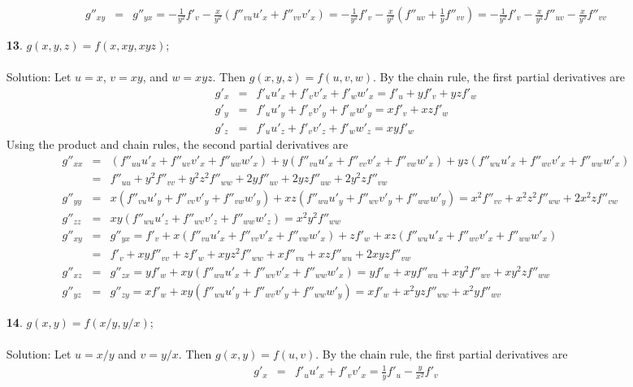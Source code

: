 \documentclass[12pt]{amsbook}
\begin{document}
\begin{enumerate}
\begin{eqnarray*}
g''_{xy}&=&g''_{yx}=-\frac{1}{y^2}f'_v-\frac{x}{y^2}(f''_{vu}u'_x+f''_{vv}v'_x)=-\frac{1}{y^2}f'_v-\frac{x}{y^2}(f''_{uv}+\frac{1}{y}f''_{vv})=-\frac{1}{y^2}f'_v-\frac{x}{y^2}f''_{uv}-\frac{x}{y^3}f''_{vv}
\end{eqnarray*}
\item[{\small\bf 13}.] $g(x,y,z)=f(x,xy,xyz)$;
\\
\\
{\sc Solution}: Let $u=x$, $v=xy$, and $w=xyz$. Then $g(x,y,z)=f(u,v,w)$. By the chain rule, the first partial derivatives are
\begin{eqnarray*}
g'_x&=&f'_uu'_x+f'_vv'_x+f'_ww'_x=f'_u+yf'_v+yzf'_w \\
g'_y&=&f'_uu'_y+f'_vv'_y+f'_ww'_y=xf'_v+xzf'_w \\
g'_z&=&f'_uu'_z+f'_vv'_z+f'_ww'_z=xyf'_w
\end{eqnarray*}
Using the product and chain rules, the second partial derivatives are
\begin{eqnarray*}
g''_{xx}&=&(f''_{uu}u'_x+f''_{uv}v'_x+f''_{uw}w'_x)+y(f''_{vu}u'_x+f''_{vv}v'_x+f''_{vw}w'_x)+yz(f''_{wu}u'_x+f''_{wv}v'_x+f''_{ww}w'_x) \\
&=&f''_{uu}+y^2f''_{vv}+y^2z^2f''_{ww}+2yf''_{uv}+2yzf''_{uw}+2y^2zf''_{vw}\\
g''_{yy}&=&x(f''_{vu}u'_y+f''_{vv}v'_y+f''_{vw}w'_y)+xz(f''_{wu}u'_y+f''_{wv}v'_y+f''_{ww}w'_y) =x^2f''_{vv}+x^2z^2f''_{ww}+2x^2zf''_{vw} \\
g''_{zz}&=&xy(f''_{wu}u'_z+f''_{wv}v'_z+f''_{ww}w'_z)=x^2y^2f''_{ww} \\
g''_{xy}&=&g''_{yx}=f'_v+x(f''_{vu}u'_x+f''_{vv}v'_x+f''_{vw}w'_x)+zf'_w+xz(f''_{wu}u'_x+f''_{wv}v'_x+f''_{ww}w'_x) \\
&=&f'_v+xyf''_{vv}+zf'_w+xyz^2f''_{ww}+xf''_{vu}+xzf''_{wu}+2xyzf''_{vw} \\
g''_{xz}&=&g''_{zx}=yf'_w+xy(f''_{wu}u'_x+f''_{wv}v'_x+f''_{ww}w'_x)=yf'_w+xyf''_{wu}+xy^2f''_{wv}+xy^2zf''_{ww} \\
g''_{yz}&=&g''_{zy}=xf'_w+xy(f''_{wu}u'_y+f''_{wv}v'_y+f''_{ww}w'_y)=xf'_w+x^2yzf''_{ww}+x^2yf''_{wv}
\end{eqnarray*}
\item[{\small\bf 14}.] $g(x,y)=f(x/y,y/x)$;
\\
\\
{\sc Solution}: Let $u=x/y$ and $v=y/x$. Then $g(x,y)=f(u,v)$. By the chain rule, the first partial derivatives are
\begin{eqnarray*}
g'_x&=&f'_uu'_x+f'_vv'_x=\frac{1}{y}f'_u-\frac{y}{x^2}f'_v \\

\end{eqnarray*}
\end{enumerate}
\end{document}
